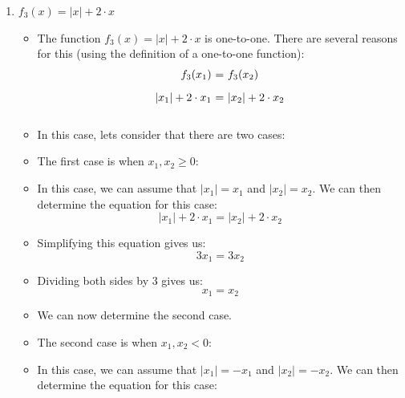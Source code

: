 \documentclass[12pt]{report}
\begin{document}
\begin{enumerate}[leftmargin=\labelsep]
\begin{enumerate}
\newpage
            \item $f_3(x)=|x|+2 \cdot x$
                \begin{tcolorbox}
                    \begin{itemize}[label={}]
                        \item The function $f_3(x)=|x|+2 \cdot x$ is one-to-one. There are several reasons for this (using the definition of a one-to-one function):
                        \begin{equation*}
                            \begin{array}{r@{~=~}l}
                                f_3(x_1) & f_3(x_2) \\ [2ex]
                                |x_1|+2 \cdot x_1 & |x_2|+2 \cdot x_2 \\ [2ex]
                            \end{array}
                        \end{equation*}
                        \item In this case, lets consider that there are two cases:
                        \item The first case is when $x_1,x_2 \geq 0$:
                        \item In this case, we can assume that $|x_1|=x_1$ and $|x_2|=x_2$. We can then determine the equation for this case:
                        \begin{equation*}
                            |x_1|+2 \cdot x_1 = |x_2|+2 \cdot x_2
                        \end{equation*}
                        \item Simplifying this equation gives us:
                        \begin{equation*}
                            3x_1 = 3x_2
                        \end{equation*}
                        \item Dividing both sides by 3 gives us:
                        \begin{equation*}
                            x_1 = x_2
                        \end{equation*}
                        \item We can now determine the second case.
                        \item The second case is when $x_1,x_2 < 0$:
                        \item In this case, we can assume that $|x_1|=-x_1$ and $|x_2|=-x_2$. We can then determine the equation for this case:

\end{itemize}
\end{tcolorbox}
\end{enumerate}
\end{enumerate}
\end{document}

